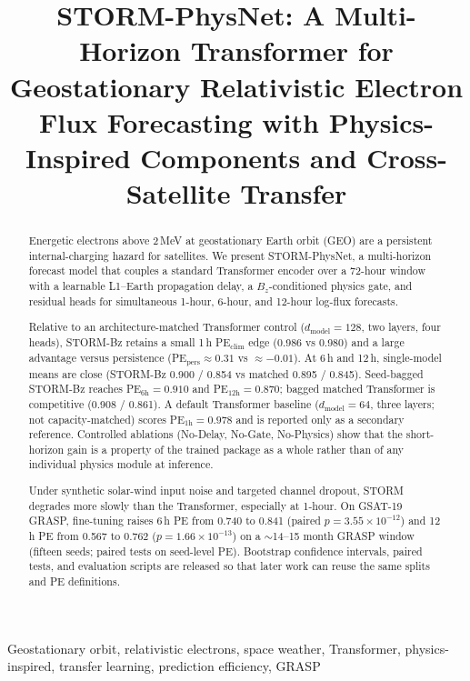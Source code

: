 \documentclass[conference]{IEEEtran}
\title{STORM-PhysNet: A Multi-Horizon Transformer for Geostationary Relativistic Electron Flux Forecasting with Physics-Inspired Components and Cross-Satellite Transfer}
\author{
\IEEEauthorblockN{Samarth BN}
\IEEEauthorblockA{BE in Electronics and Communication\\
RV College of Engineering, Bengaluru, India\\
Email: samarthbn.ec25@rvce.edu.in}
}
\begin{document}
\maketitle

\begin{abstract}
Energetic electrons above 2\,MeV at geostationary Earth orbit (GEO)
are a persistent internal-charging hazard for satellites. We present
STORM-PhysNet, a multi-horizon forecast model that couples a standard
Transformer encoder over a 72-hour window with a learnable L1--Earth
propagation delay, a \(B_z\)-conditioned physics gate, and residual
heads for simultaneous 1-hour, 6-hour, and 12-hour log-flux
forecasts.

Relative to an architecture-matched Transformer control
($d_{\mathrm{model}}=128$, two layers, four heads), STORM-Bz retains a small
1\,h PE$_{\mathrm{clim}}$ edge (0.986 vs 0.980) and a large advantage versus
persistence (PE$_{\mathrm{pers}} \approx 0.31$ vs $\approx -0.01$). At 6\,h and 12\,h, single-model
means are close (STORM-Bz 0.900 / 0.854 vs matched 0.895 / 0.845).
Seed-bagged STORM-Bz reaches PE$_{6\mathrm{h}} = 0.910$ and PE$_{12\mathrm{h}} = 0.870$;
bagged matched Transformer is competitive (0.908 / 0.861).
A default Transformer baseline ($d_{\mathrm{model}}=64$, three layers; not
capacity-matched) scores PE$_{1\mathrm{h}} = 0.978$ and is reported only as a
secondary reference. Controlled ablations (No-Delay, No-Gate,
No-Physics) show that the short-horizon gain is a property of the
trained package as a whole rather than of any individual physics
module at inference.

Under synthetic solar-wind input noise and targeted channel dropout,
STORM degrades more slowly than the Transformer, especially at
1-hour. On GSAT-19 GRASP, fine-tuning raises 6\,h PE from
0.740 to 0.841 (paired \(p = 3.55\times10^{-12}\)) and 12\,h PE from
0.567 to 0.762 (\(p = 1.66\times10^{-13}\)) on a $\sim$14--15 month GRASP window (fifteen seeds; paired tests on seed-level PE).
Bootstrap confidence intervals, paired tests, and evaluation scripts
are released so that later work can reuse the same splits and PE
definitions.
\end{abstract}

\begin{IEEEkeywords}
Geostationary orbit, relativistic electrons, space weather, Transformer,
physics-inspired, transfer learning, prediction efficiency, GRASP
\end{IEEEkeywords}
\end{document}
